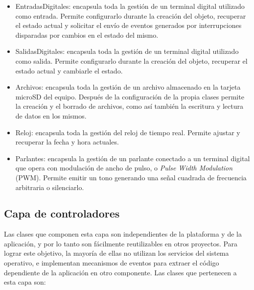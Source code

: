 \begin{itemize}
	\item EntradasDigitales: encapsula toda la gestión de un terminal digital utilizado como entrada. Permite configurarlo durante la creación del objeto, recuperar el estado actual y solicitar el envío de eventos generados por interrupciones disparadas por cambios en el estado del mismo.
	
	\item SalidasDigitales: encapsula toda la gestión de un terminal digital utilizado como salida. Permite configurarlo durante la creación del objeto, recuperar el estado actual y cambiarle el estado.
	
	\item Archivos: encapsula toda la gestión de un archivo almacenado en la tarjeta microSD del equipo. Después de la configuración de la propia clases permite la creación y el borrado de archivos, como así también la escritura y lectura de datos en los mismos.
	
	\item Reloj: encapsula toda la gestión del reloj de tiempo real. Permite ajustar y recuperar la fecha y hora actuales.
	
	\item Parlantes: encapsula la gestión de un parlante conectado a un terminal digital que opera con modulación de ancho de pulso, o \emph{Pulse Width Modulation} (PWM). Permite emitir un tono  generando una señal cuadrada de frecuencia arbitraria o silenciarlo.
\end{itemize}

\FloatBarrier

\subsection{Capa de controladores}

Las clases que componen esta capa son independientes de la plataforma y de la aplicación, y por lo tanto son fácilmente reutilizables en otros proyectos. Para lograr este objetivo, la mayoría de ellas no utilizan  los servicios del sistema operativo, e implementan mecanismos de eventos para  extraer el código dependiente de la aplicación en otro componente. Las clases que pertenecen a esta capa son:

